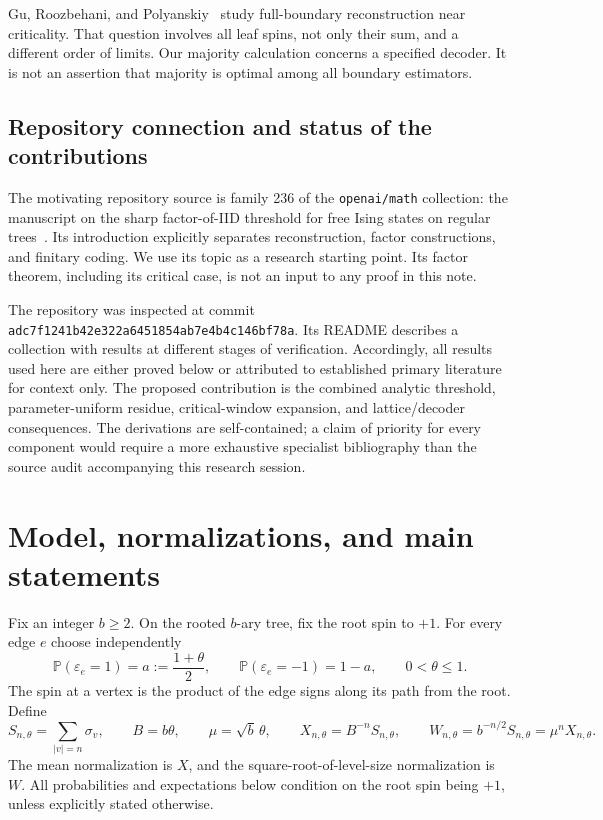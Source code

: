 \documentclass[11pt]{article}
\theoremstyle{definition}
\newcommand{\Prob}{\mathbb P}
\begin{document}
Gu, Roozbehani, and Polyanskiy~\cite{GuRoozbehaniPolyanskiy2020}
study full-boundary reconstruction near criticality. That question
involves all leaf spins, not only their sum, and a different order of
limits. Our majority calculation concerns a specified decoder. It is not
an assertion that majority is optimal among all boundary estimators.

\subsection{Repository connection and status of the contributions}

The motivating repository source is family 236 of the
\texttt{openai/math} collection: the manuscript on the sharp
factor-of-IID threshold for free Ising states on regular
trees~\cite{OpenAIFactor}. Its introduction explicitly separates
reconstruction, factor constructions, and finitary coding. We use its
topic as a research starting point. Its factor theorem, including its
critical case, is not an input to any proof in this note.

The repository was inspected at commit
\texttt{adc7f1241b42e322a6451854ab7e4b4c146bf78a}. Its README describes
a collection with results at different stages of verification. Accordingly,
all results used here are either proved below or attributed to established
primary literature for context only. The proposed contribution is the
combined analytic threshold, parameter-uniform residue, critical-window
expansion, and lattice/decoder consequences. The derivations are
self-contained; a claim of priority for every component would require a
more exhaustive specialist bibliography than the source audit accompanying
this research session.

\section{Model, normalizations, and main statements}

Fix an integer $b\geq2$. On the rooted $b$-ary tree, fix the root spin
to $+1$. For every edge $e$ choose independently
\[
 \Prob(\varepsilon_e=1)=a:=\frac{1+\theta}{2},\qquad
 \Prob(\varepsilon_e=-1)=1-a,\qquad 0<\theta\leq1.
\]
The spin at a vertex is the product of the edge signs along its path
from the root. Define
\begin{equation}\label{eq:normalizations}
 S_{n,\theta}=\sum_{|v|=n}\sigma_v,
 \qquad B=b\theta,\qquad \mu=\sqrt b\,\theta,
 \qquad X_{n,\theta}=B^{-n}S_{n,\theta},
 \qquad W_{n,\theta}=b^{-n/2}S_{n,\theta}=\mu^nX_{n,\theta}.
\end{equation}
The mean normalization is $X$, and the square-root-of-level-size
normalization is $W$. All probabilities and expectations below condition
on the root spin being $+1$, unless explicitly stated otherwise.
\end{document}
